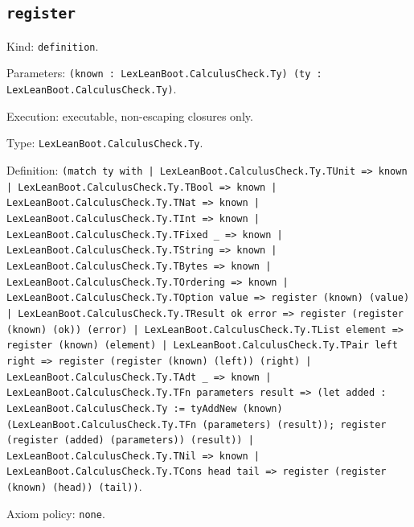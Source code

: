 \documentclass[11pt]{article}
\begin{document}
\subsection*{\texttt{register}}
\noindent Kind: \texttt{definition}.\par
\noindent Parameters: \texttt{(known : LexLeanBoot.CalculusCheck.Ty) (ty : LexLeanBoot.CalculusCheck.Ty)}.\par
\noindent Execution: executable, non-escaping closures only.\par
\noindent Type: \texttt{LexLeanBoot.CalculusCheck.Ty}.\par
\noindent Definition: \texttt{(match ty with | LexLeanBoot.CalculusCheck.Ty.TUnit => known | LexLeanBoot.CalculusCheck.Ty.TBool => known | LexLeanBoot.CalculusCheck.Ty.TNat => known | LexLeanBoot.CalculusCheck.Ty.TInt => known | LexLeanBoot.CalculusCheck.Ty.TFixed \_ => known | LexLeanBoot.CalculusCheck.Ty.TString => known | LexLeanBoot.CalculusCheck.Ty.TBytes => known | LexLeanBoot.CalculusCheck.Ty.TOrdering => known | LexLeanBoot.CalculusCheck.Ty.TOption value => register (known) (value) | LexLeanBoot.CalculusCheck.Ty.TResult ok error => register (register (known) (ok)) (error) | LexLeanBoot.CalculusCheck.Ty.TList element => register (known) (element) | LexLeanBoot.CalculusCheck.Ty.TPair left right => register (register (known) (left)) (right) | LexLeanBoot.CalculusCheck.Ty.TAdt \_ => known | LexLeanBoot.CalculusCheck.Ty.TFn parameters result => (let added : LexLeanBoot.CalculusCheck.Ty := tyAddNew (known) (LexLeanBoot.CalculusCheck.Ty.TFn (parameters) (result)); register (register (added) (parameters)) (result)) | LexLeanBoot.CalculusCheck.Ty.TNil => known | LexLeanBoot.CalculusCheck.Ty.TCons head tail => register (register (known) (head)) (tail))}.\par
\noindent Axiom policy: \texttt{none}.\par
\end{document}
